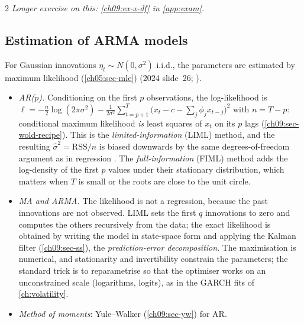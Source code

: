 \begin{paracol}{2}
\noindent\emph{Longer exercise on this: \cref{ch09:ex-x-df} in \cref{app:exam}.}

\subsection{Estimation of ARMA models}\label{ch09:sec-est}
For Gaussian innovations $\eta_t\sim N(0,\sigma^2)$ i.i.d., the parameters are estimated by maximum likelihood
(\cref{ch05:sec-mle}) (2024 slide~26; ).
\begin{itemize}
  \item \emph{AR($p$).} Conditioning on the first $p$ observations, the log-likelihood is
        $\ell=-\frac n2\log(2\pi\sigma^2)-\frac1{2\sigma^2}\sum_{t=p+1}^{T}\bigl(x_t-c-\sum_j\phi_jx_{t-j}\bigr)^2$ with $n=T-p$:
        conditional maximum likelihood \emph{is} least squares of $x_t$ on its $p$ lags (\cref{ch09:sec-wold-recipe}). This is
        the \emph{limited-information} (LIML) method, and the resulting $\hat\sigma^2=\mathrm{RSS}/n$ is
        biased downwards by the same degrees-of-freedom argument as in regression . The
        \emph{full-information} (FIML) method adds the log-density of the first $p$ values under their stationary distribution,
        which matters when $T$ is small or the roots are close to the unit circle.
  \item \emph{MA and ARMA.} The likelihood is not a regression, because the past innovations are not observed. LIML sets the
        first $q$ innovations to zero and computes the others recursively from the data; the exact likelihood is obtained by
        writing the model in state-space form and applying the Kalman filter (\cref{ch09:sec-ss}), the
        \emph{prediction-error decomposition}. The maximisation is numerical, and stationarity and invertibility constrain the
        parameters; the standard trick is to reparametrise so that the optimiser works on an unconstrained
        scale (logarithms, logits), as in the GARCH fits of \cref{ch:volatility}.
  \item \emph{Method of moments}: Yule--Walker (\cref{ch09:sec-yw}) for AR.
\end{itemize}


\end{paracol}
